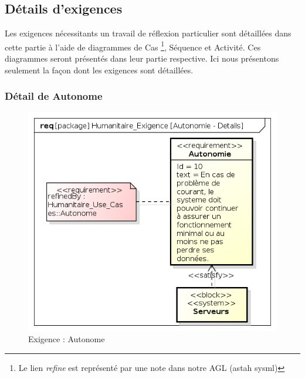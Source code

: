 \documentclass[11pt, titlepage]{report}
\begin{document}
\subsection{Détails d'exigences}
Les exigences nécessitants un travail de réflexion particulier sont détaillées dans cette partie à l'aide de diagrammes de Cas \footnote{Le lien \textit{refine} est représenté par une note dans notre AGL (astah sysml) }, Séquence et Activité. Ces diagrammes seront présentés dans leur partie respective. Ici nous présentons seulement la façon dont les exigences sont détaillées.
\clearpage
\subsubsection{Détail de Autonome}
\begin{figure}[h!]
\centering
\includegraphics[scale=.4]{../images/diagrammes/sysml/exigence/autonomie_details.png}
\caption{Exigence : Autonome}
\end{figure}
\end{document}
